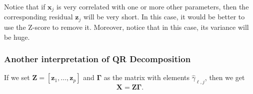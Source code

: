 \documentclass[11pt]{article}
\theoremstyle{definition}
\newcommand{\XX}{\mathbf{X}}
\newcommand{\xx}{\mathbf{x}}
\newcommand{\zz}{\mathbf{z}}
\newcommand{\ZZ}{\mathbf{Z}}
\newcommand{\GG}{\mathbf{\Gamma}}
\begin{document}
Notice that if $\xx_j$ is very correlated with one or more other parameters,
then the corresponding residual $\zz_j$ will be very short. In this case, it
would be better to use the Z-score to remove it. Moreover, notice that in this
case, its variance will be huge.

\subsubsection{Another interpretation of QR Decomposition}
If we set $\ZZ=[\zz_1,\ldots,\zz_p]$ and $\GG$ as the matrix with elements
$\hat\gamma_{\ell,j}$, then we get
\[\XX=\ZZ\GG.\]
\end{document}
